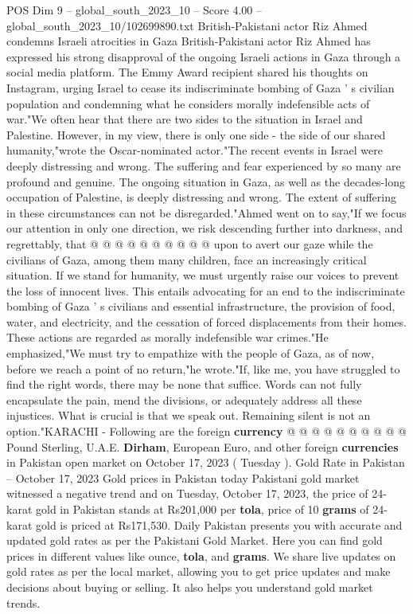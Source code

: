 \begin{textsample}{POS Dim 9 – global\_south\_2023\_10 – Score 4.00 – global\_south\_2023\_10/102699890.txt}  \label{ex:f9_pos_084}
British-Pakistani actor Riz Ahmed condemns Israeli atrocities in Gaza British-Pakistani actor Riz Ahmed has expressed his strong disapproval of the ongoing Israeli actions in Gaza through a social media platform.
The Emmy Award recipient shared his thoughts on Instagram, urging Israel to cease its indiscriminate bombing of Gaza ' s civilian population and condemning what he considers morally indefensible acts of war."We often hear that there are two sides to the situation in Israel and Palestine.
However, in my view, there is only one side - the side of our shared humanity,"wrote the Oscar-nominated actor."The recent events in Israel were deeply distressing and wrong.
The suffering and fear experienced by so many are profound and genuine.
The ongoing situation in Gaza, as well as the decades-long occupation of Palestine, is deeply distressing and wrong.
The extent of suffering in these circumstances can not be disregarded."Ahmed went on to say,"If we focus our attention in only one direction, we risk descending further into darkness, and regrettably, that @ @ @ @ @ @ @ @ @ @ upon to avert our gaze while the civilians of Gaza, among them many children, face an increasingly critical situation.
If we stand for humanity, we must urgently raise our voices to prevent the loss of innocent lives.
This entails advocating for an end to the indiscriminate bombing of Gaza ' s civilians and essential infrastructure, the provision of food, water, and electricity, and the cessation of forced displacements from their homes.
These actions are regarded as morally indefensible war crimes."He emphasized,"We must try to empathize with the people of Gaza, as of now, before we reach a point of no return,"he wrote."If, like me, you have struggled to find the right words, there may be none that suffice.
Words can not fully encapsulate the pain, mend the divisions, or adequately address all these injustices.
What is crucial is that we speak out.
Remaining silent is not an option."KARACHI - Following are the foreign \textbf{currency} @ @ @ @ @ @ @ @ @ @ Pound Sterling, U.A.E. \textbf{Dirham}, European Euro, and other foreign \textbf{currencies} in Pakistan open market on October 17, 2023 ( Tuesday ).
Gold Rate in Pakistan -- October 17, 2023 Gold prices in Pakistan today Pakistani gold market witnessed a negative trend and on Tuesday, October 17, 2023, the price of 24-karat gold in Pakistan stands at Rs201,000 per \textbf{tola}, price of 10 \textbf{grams} of 24-karat gold is priced at Rs171,530.
Daily Pakistan presents you with accurate and updated gold rates as per the Pakistani Gold Market.
Here you can find gold prices in different values like ounce, \textbf{tola}, and \textbf{grams}.
We share live updates on gold rates as per the local market, allowing you to get price updates and make decisions about buying or selling.
It also helps you understand gold market trends.

\end{textsample}
